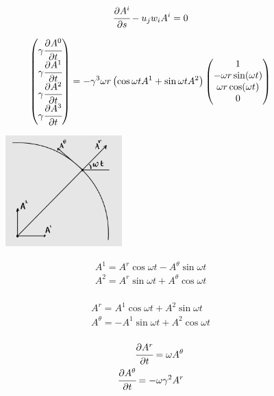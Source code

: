 \documentclass[a4paper]{article}
\newcommand{\inner}[1]{\left( #1 \right)}
\newcommand{\piv}[2]{\cfrac{\partial #1}{\partial #2}}
\numberwithin{equation}{section}
\begin{document}
\begin{eqnarray}
    \piv{A^i}{s} - u_jw_iA^i = 0
\end{eqnarray}

\begin{gather}
    \begin{pmatrix}
        \gamma\piv{A^0}{t} \\ \gamma\piv{A^1}{t} \\ \gamma\piv{A^2}{t} \\ \gamma\piv{A^3}{t}
    \end{pmatrix}
    =
    -\gamma^3 \omega r \inner{\cos{\omega t}A^1 + \sin{\omega t}A^2}
    \begin{pmatrix}
        1 \\ -\omega r\sin(\omega t) \\ \omega r\cos(\omega t) \\ 0
    \end{pmatrix}
\end{gather}

\begin{figure}[H]
    \centering
    \includegraphics[width=0.4\textwidth]{sp.jpg}
\end{figure}

\begin{eqnarray}
    A^1 = A^r \cos{\omega t} - A^\theta \sin{\omega t} \\
    A^2 = A^r \sin{\omega t} + A^\theta \cos{\omega t} \\
\end{eqnarray}

\begin{eqnarray}
    A^r = A^1 \cos{\omega t} + A^2 \sin{\omega t} \\
    A^\theta = -A^1 \sin{\omega t} + A^2 \cos{\omega t} \\
\end{eqnarray}


\begin{eqnarray}
    \piv{A^r}{t} = \omega A^\theta \\
    \piv{A^\theta}{t} = -\omega \gamma^2 A^r
\end{eqnarray}
\end{document}
